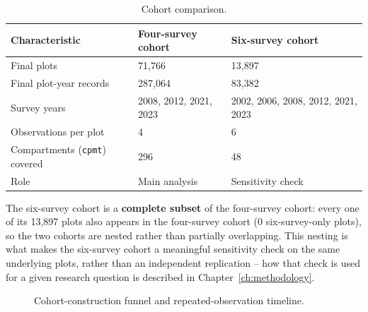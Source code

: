 \begin{table}[!htbp]
\centering
\scriptsize
\setlength{\tabcolsep}{2.5pt}
\renewcommand{\arraystretch}{0.9}
\begin{tabular}{p{4.3cm}p{3.2cm}p{3.2cm}}
\hline
Characteristic & Four-survey cohort & Six-survey cohort \\
\hline
Final plots & 71,766 & 13,897 \\
Final plot-year records & 287,064 & 83,382 \\
Survey years & 2008, 2012, 2021, 2023 & 2002, 2006, 2008, 2012, 2021, 2023 \\
Observations per plot & 4 & 6 \\
Compartments (\texttt{cpmt}) covered & 296 & 48 \\
Role & Main analysis & Sensitivity check \\
\hline
\end{tabular}
\caption{Cohort comparison. }
\label{tab:data-cohort-comparison}
\end{table}

The six-survey cohort is a \textbf{complete subset} of the four-survey cohort: every one of its
13,897 plots also appears in the four-survey cohort (0 six-survey-only plots), so the two cohorts
are nested rather than partially overlapping. This nesting is what makes the six-survey cohort a
meaningful sensitivity check on the same underlying plots, rather than an independent replication
-- how that check is used for a given research question is described in
Chapter~\ref{ch:methodology}.

\begin{figure}[!htbp]
\centering
{}
\caption{Cohort-construction funnel and repeated-observation timeline.}
\label{fig:data-funnel-timeline}
\end{figure}

